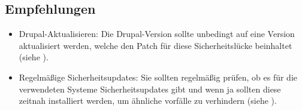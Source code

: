 \subsection*{Empfehlungen}
\begin{itemize}
    \item Drupal-Aktualisieren: Die Drupal-Version sollte unbedingt auf eine Version aktualisiert werden, welche den Patch für diese Sicherheitslücke beinhaltet (siehe \cite{owaspVulnerableDependency}).
    \item Regelmäßige Sicherheitsupdates: Sie sollten regelmäßig prüfen, ob es für die verwendeten Systeme Sicherheitsupdates gibt und wenn ja sollten diese zeitnah installiert werden, um ähnliche vorfälle zu verhindern (siehe \cite{owaspVulnerableDependency}).
\end{itemize}